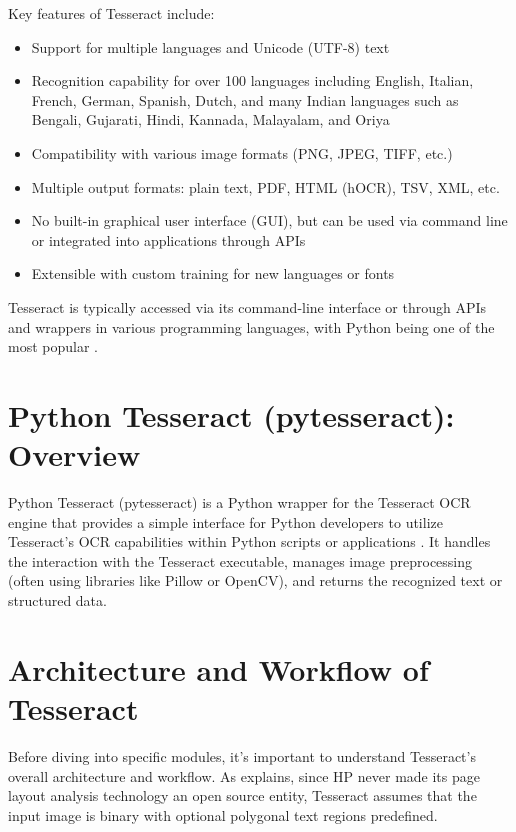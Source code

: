 Key features of Tesseract include:
\begin{itemize}
	\item Support for multiple languages and Unicode (UTF-8) text
	\item Recognition capability for over 100 languages including English, Italian, French, German, Spanish, Dutch, and many Indian languages such as Bengali, Gujarati, Hindi, Kannada, Malayalam, and Oriya \cite {Joshi:2021}
	\item Compatibility with various image formats (PNG, JPEG, TIFF, etc.)
	\item Multiple output formats: plain text, PDF, HTML (hOCR), TSV, XML, etc.
	\item No built-in graphical user interface (GUI), but can be used via command line or integrated into applications through APIs
	\item Extensible with custom training for new languages or fonts
\end{itemize}

Tesseract is typically accessed via its command-line interface or through APIs and wrappers in various programming languages, with Python being one of the most popular \cite {Anitha:2024, DataCamp:2024}.


\section{Python Tesseract (pytesseract): Overview}

Python Tesseract (pytesseract) is a Python wrapper for the Tesseract OCR engine that provides a simple interface for Python developers to utilize Tesseract's OCR capabilities within Python scripts or applications \cite {Nutrient:2025}. It handles the interaction with the Tesseract executable, manages image preprocessing (often using libraries like Pillow or OpenCV), and returns the recognized text or structured data.


\section{Architecture and Workflow of Tesseract}

Before diving into specific modules, it's important to understand Tesseract's overall architecture and workflow. As \cite{Joshi:2021} explains, since HP never made its page layout analysis technology an open source entity, Tesseract assumes that the input image is binary with optional polygonal text regions predefined.

